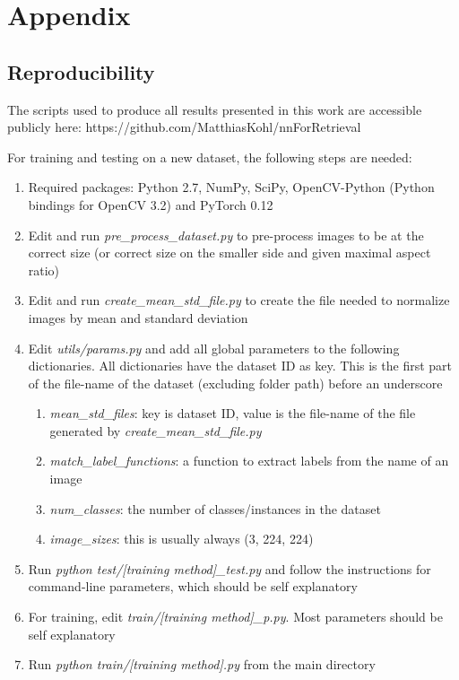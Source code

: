 
\appendix \chapter{Appendix}

\section{Reproducibility}
The scripts used to produce all results presented in this work are accessible
publicly here: https://github.com/MatthiasKohl/nnForRetrieval

For training and testing on a new dataset, the following steps are needed:

\begin{enumerate}
    \item Required packages: Python 2.7, NumPy, SciPy, OpenCV-Python
    (Python bindings for OpenCV 3.2) and PyTorch 0.12
    \item Edit and run \emph{pre\_process\_dataset.py} to pre-process
    images to be at the correct size (or correct size on the smaller
    side and given maximal aspect ratio)
    \item Edit and run \emph{create\_mean\_std\_file.py} to create the
    file needed to normalize images by mean and standard deviation
    \item Edit \emph{utils/params.py} and add all global parameters
    to the following dictionaries. All dictionaries have the dataset
    ID as key. This is the first part of the file-name of the dataset
    (excluding folder path) before an underscore
    \begin{enumerate}
        \item \emph{mean\_std\_files}: key is dataset ID, value is the file-name
        of the file generated by \emph{create\_mean\_std\_file.py}
        \item \emph{match\_label\_functions}: a function to extract labels
        from the name of an image
        \item \emph{num\_classes}: the number of classes/instances in the dataset
        \item \emph{image\_sizes}: this is usually always (3, 224, 224)
    \end{enumerate}
    \item Run \emph{python test/[training method]\_test.py} and follow
    the instructions for command-line parameters, which should be self
    explanatory
    \item For training, edit \emph{train/[training method]\_p.py}.
    Most parameters should be self explanatory
    \item Run \emph{python train/[training method].py} from the main
    directory
\end{enumerate}

